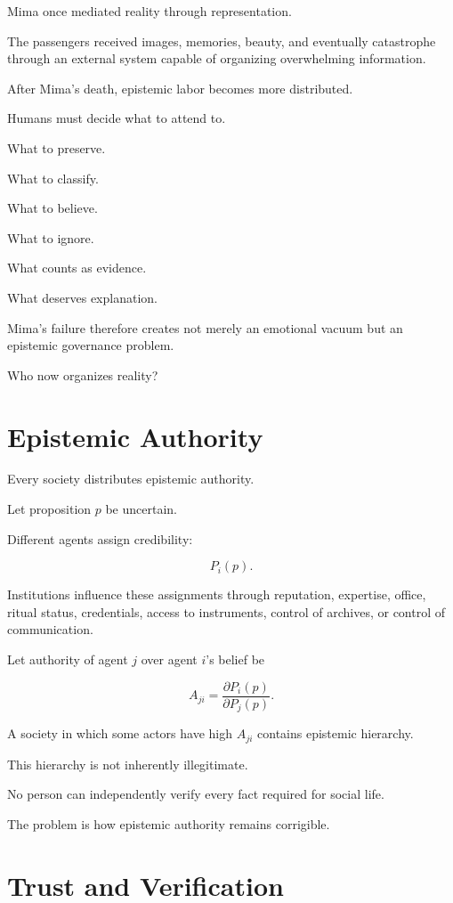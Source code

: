 \documentclass[11pt,oneside]{book}
\theoremstyle{definition}
\theoremstyle{remark}
\begin{document}
Mima once mediated reality through representation.

The passengers received images, memories, beauty, and eventually catastrophe through an external system capable of organizing overwhelming information.

After Mima's death, epistemic labor becomes more distributed.

Humans must decide what to attend to.

What to preserve.

What to classify.

What to believe.

What to ignore.

What counts as evidence.

What deserves explanation.

Mima's failure therefore creates not merely an emotional vacuum but an epistemic governance problem.

Who now organizes reality?

\section{Epistemic Authority}

Every society distributes epistemic authority.

Let proposition \(p\) be uncertain.

Different agents assign credibility:

\[
P_i(p).
\]

Institutions influence these assignments through reputation, expertise, office, ritual status, credentials, access to instruments, control of archives, or control of communication.

Let authority of agent \(j\) over agent \(i\)'s belief be

\[
A_{ji}
=
\frac{\partial P_i(p)}
{\partial P_j(p)}.
\]

A society in which some actors have high \(A_{ji}\) contains epistemic hierarchy.

This hierarchy is not inherently illegitimate.

No person can independently verify every fact required for social life.

The problem is how epistemic authority remains corrigible.

\section{Trust and Verification}
\end{document}

